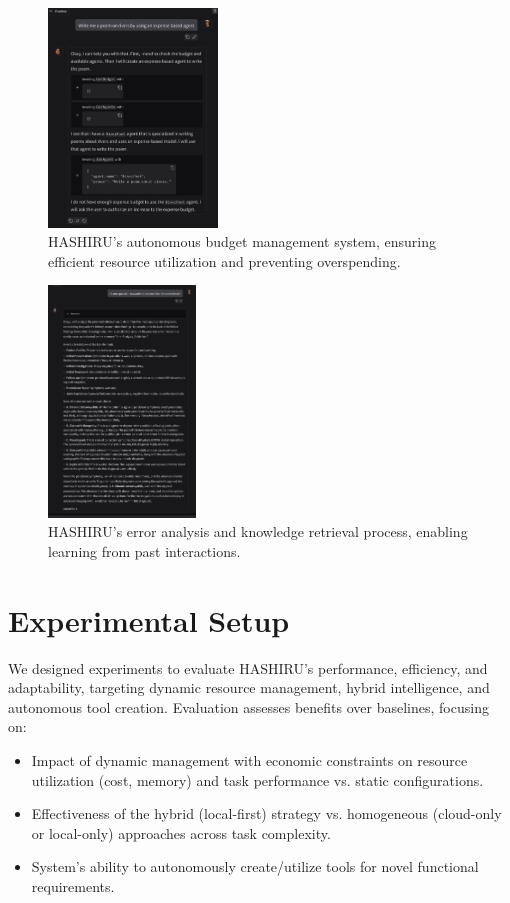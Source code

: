 \documentclass[conference]{IEEEtran}
\begin{document}
\begin{figure}[h]
    \centering
    \includegraphics[width=0.4\textwidth]{budget2.png}
    \caption{HASHIRU's autonomous budget management system, ensuring efficient resource utilization and preventing overspending.}
    \label{fig:budget_management}
\end{figure}

\begin{figure}[h]
    \centering
    \includegraphics[width=0.35\textwidth]{casestudy4.png}
    \caption{HASHIRU's error analysis and knowledge retrieval process, enabling learning from past interactions.}
    \label{fig:error_analysis}
\end{figure}

\section{Experimental Setup}
\label{sec:experiments}

We designed experiments to evaluate HASHIRU's performance, efficiency, and adaptability, targeting dynamic resource management, hybrid intelligence, and autonomous tool creation. Evaluation assesses benefits over baselines, focusing on:
\begin{itemize}
    \item Impact of dynamic management with economic constraints on resource utilization (cost, memory) and task performance vs. static configurations.
    \item Effectiveness of the hybrid (local-first) strategy vs. homogeneous (cloud-only or local-only) approaches across task complexity.
    \item System's ability to autonomously create/utilize tools for novel functional requirements.
\end{itemize}
\end{document}
